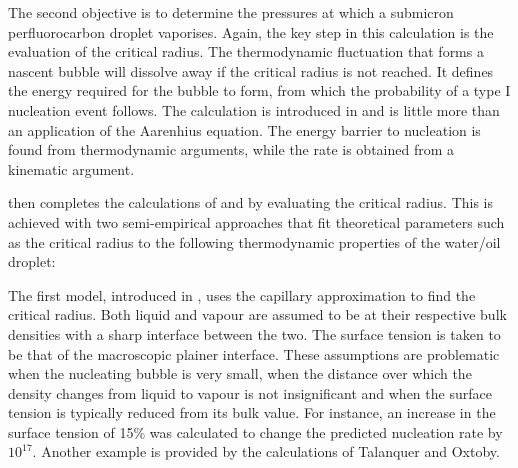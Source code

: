 The second objective is to determine the pressures at which a submicron perfluorocarbon droplet vaporises.
Again, the key step in this calculation is the evaluation of the critical radius. %
The thermodynamic fluctuation that forms a nascent bubble 
will dissolve away if the critical radius is not reached.
It defines the energy required for the bubble to form,
from which %
the probability of a type I nucleation event follows.
The calculation is introduced in 
and is little more than an application of the Aarenhius equation.
The energy barrier to nucleation is found from thermodynamic arguments,
while the rate is obtained from a kinematic argument.

 then completes the calculations of  and 
by evaluating the critical radius.
This is achieved with two semi-empirical approaches
that fit theoretical parameters such as the critical radius
to the following thermodynamic properties of the water/oil droplet:

The first model, introduced in , uses the capillary approximation to find the critical radius.
Both liquid and vapour are assumed to be at their respective bulk densities with a sharp interface between the two.
The surface tension is taken to be that of the macroscopic plainer interface.
These assumptions are problematic when the nucleating bubble is very small\cite{Talanquer1995},
when the distance over which the density changes from liquid to vapour is not insignificant
and when the surface tension is typically reduced from its bulk value\cite{Kiang1971}.
For instance, %
an increase in the surface tension of 15\%
was calculated\cite{Kiang1971} to change the predicted nucleation rate by $10^{17}$.
Another example is provided by the calculations of Talanquer and Oxtoby\cite{Talanquer1995, Oxtoby1988}.

